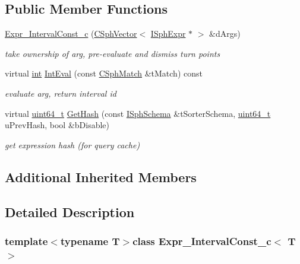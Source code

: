 \subsection*{Public Member Functions}
\begin{DoxyCompactItemize}
\item 
\hyperlink{classExpr__IntervalConst__c_a86edaacbfd9fed5b5deb603468af08cf}{Expr\-\_\-\-Interval\-Const\-\_\-c} (\hyperlink{classCSphVector}{C\-Sph\-Vector}$<$ \hyperlink{structISphExpr}{I\-Sph\-Expr} $\ast$ $>$ \&d\-Args)
\begin{DoxyCompactList}\small\item\em take ownership of arg, pre-\/evaluate and dismiss turn points \end{DoxyCompactList}\item 
virtual \hyperlink{sphinxexpr_8cpp_a4a26e8f9cb8b736e0c4cbf4d16de985e}{int} \hyperlink{classExpr__IntervalConst__c_a6f46fb812d07df75146c2b54f0791557}{Int\-Eval} (const \hyperlink{classCSphMatch}{C\-Sph\-Match} \&t\-Match) const 
\begin{DoxyCompactList}\small\item\em evaluate arg, return interval id \end{DoxyCompactList}\item 
virtual \hyperlink{sphinxstd_8h_aaa5d1cd013383c889537491c3cfd9aad}{uint64\-\_\-t} \hyperlink{classExpr__IntervalConst__c_a20faf025217ed1f36a607b4eec3e19cf}{Get\-Hash} (const \hyperlink{classISphSchema}{I\-Sph\-Schema} \&t\-Sorter\-Schema, \hyperlink{sphinxstd_8h_aaa5d1cd013383c889537491c3cfd9aad}{uint64\-\_\-t} u\-Prev\-Hash, bool \&b\-Disable)
\begin{DoxyCompactList}\small\item\em get expression hash (for query cache) \end{DoxyCompactList}\end{DoxyCompactItemize}
\subsection*{Additional Inherited Members}


\subsection{Detailed Description}
\subsubsection*{template$<$typename T$>$class Expr\-\_\-\-Interval\-Const\-\_\-c$<$ T $>$}

